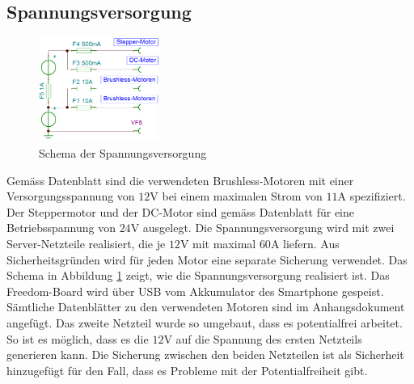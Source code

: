     \subsection{Spannungsversorgung}       
        \begin{figure}
           	\includegraphics[width=0.35\textwidth,clip,trim=0mm 0.5mm 0mm 0mm]
           	{Enddokumentation/Bilder/BeschaltungNetzteile.png}
           	\centering
           	\caption{Schema der Spannungsversorgung} 
           	\label{abb:Spannungsversorgung}
        \end{figure}
        Gemäss Datenblatt sind die verwendeten Brushless-Motoren mit einer Versorgungsspannung 
        von $12\si{\volt}$ bei einem maximalen Strom von $11\si{\ampere}$ spezifiziert. 
        Der Steppermotor und der DC-Motor sind gemäss Datenblatt für eine Betriebsspannung 
        von $24\si{\volt}$ ausgelegt. Die Spannungsversorgung wird mit zwei Server-Netzteile 
        realisiert, die je $12\si{\volt}$ mit maximal $60\si{\ampere}$ liefern. Aus 
        Sicherheitsgründen wird für jeden Motor eine separate Sicherung verwendet. Das Schema 
        in Abbildung \ref{abb:Spannungsversorgung} zeigt, wie die Spannungsversorgung 
        realisiert ist. Das Freedom-Board wird über USB vom Akkumulator des Smartphone 
        gespeist. Sämtliche Datenblätter zu den verwendeten Motoren sind im Anhangsdokument 
        angefügt. Das zweite Netzteil wurde so umgebaut, dass es potentialfrei arbeitet. So 
        ist es möglich, dass es die $12\si{\volt}$ auf die Spannung des ersten Netzteils 
        generieren kann. Die Sicherung zwischen den beiden Netzteilen ist als Sicherheit 
        hinzugefügt für den Fall, dass es Probleme mit der Potentialfreiheit gibt.	